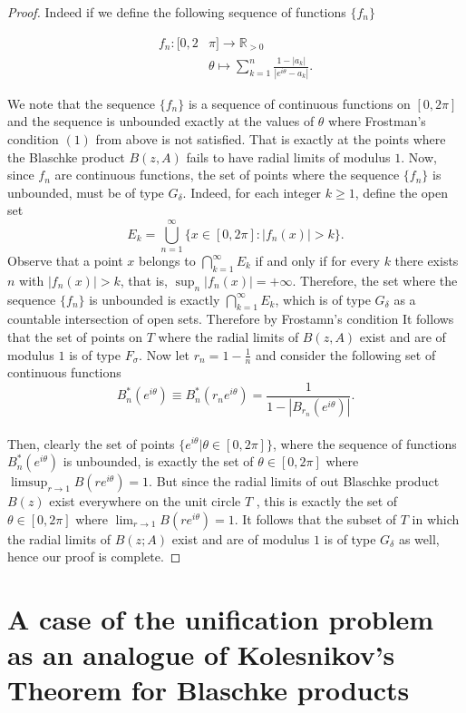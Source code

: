 \documentclass[12pt]{article}
\begin{document}
\begin{proof} Indeed if we define the following sequence of functions $\lbrace f_n \rbrace$

\begin{align*}
f_n:[0,2&\pi]\rightarrow\mathbb{R}_{>0}\\
&\theta\longmapsto\sum_{k=1}^{n}\frac{1-|a_k|}{|e^{i\theta}-a_k|}.
\end{align*}

\noindent We note that the sequence $\lbrace f_n\rbrace$ is a sequence of continuous functions on $[0,2\pi]$ and the sequence is unbounded exactly at the values of $\theta$  where {Frostman's condition} $(1)$ from above is not satisfied. That is exactly at the points where the Blaschke product $B(z,A)$ fails to have radial limits of modulus $1$. Now, since $f_n$ are continuous functions, the set of points where the sequence $\lbrace f_n\rbrace$ is unbounded, must be of type $G_\delta$. Indeed, for each integer $k \ge 1$, define the open set
\[
E_k = \bigcup_{n=1}^\infty \bigl\{ x \in [0,2\pi] : |f_n(x)| > k \bigr\}.
\]
Observe that a point $x$ belongs to $\bigcap_{k=1}^\infty E_k$ if and only if for every $k$ there exists $n$ with $|f_n(x)| > k$, that is, $\sup_n |f_n(x)| = +\infty$. Therefore, the set where the sequence $\{f_n\}$ is unbounded is exactly $\bigcap_{k=1}^\infty E_k$, which is of type $G_\delta$ as a countable intersection of open sets.
 Therefore by Frostamn's condition It follows that the set of points on $T$ where the radial limits of $B(z,A)$ exist and are of modulus $1$ is of type $F_\sigma$. Now let $r_n=1-\frac{1}{n}$ and consider the following set of continuous functions $$B^*_n(e^{i\theta})\equiv B^*_n(r_ne^{i\theta})=\frac{1}{1-|B_{{r_n}}(e^{i\theta})|}.$$\\

\noindent Then, clearly the set of points $\lbrace e^{i\theta} |\theta \in [0,2\pi]\rbrace$,  where the sequence of functions $B^*_n(e^{i\theta})$ is unbounded, is exactly the set of $\theta\in [0, 2\pi]$ where $\limsup_{r\rightarrow 1}B(re^{i\theta})=1$. But since the radial limits of out Blaschke product $B(z)$ exist everywhere on the unit circle $T$ , this is exactly the set of $\theta\in[0,2\pi]$ where $\lim_{r\rightarrow 1}B(re^{i\theta})=1$. It follows that the subset of $T$ in which the radial limits of $B(z;A)$ exist and are of modulus $1$ is of type $G_\delta$ as well, hence our proof is complete.
\end{proof}

\section{A case of the unification problem as an analogue of Kolesnikov's Theorem for Blaschke products} 
\end{document}
